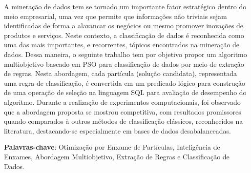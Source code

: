 \begin{resumo}
A mineração de dados tem se tornado um importante fator estratégico dentro do meio empresarial, uma vez que permite que informações não triviais sejam identificadas de forma a alavancar os negócios ou mesmo promover inovações de produtos e serviços. Neste contexto, a classificação de dados é reconhecida como uma das mais importantes, e recorrentes, tópicos encontrados na mineração de dados. Dessa maneira, o seguinte trabalho tem por objetivo propor um algoritmo multiobjetivo baseado em PSO para classificação de dados por meio de extração de regras. Nesta abordagem, cada partícula (solução candidata), representada uma regra de classificação, é convertida em um predicado lógico para construção de uma operação de seleção na linguagem SQL para avaliação de desempenho do algoritmo. Durante a realização de experimentos computacionais, foi observado que a abordagem proposta se mostrou competitiva, com resultados promissores quando comparados à outros métodos de classificação clássicos, reconhecidos na literatura, destacando-se especialmente em bases de dados desabalanceadas. 

\vspace{1.5ex}

\noindent \textbf{Palavras-chave}: Otimização por Enxame de Partículas, Inteligência de Enxames, Abordagem Multiobjetivo, Extração de Regras e Classificação de Dados. 
\end{resumo}
